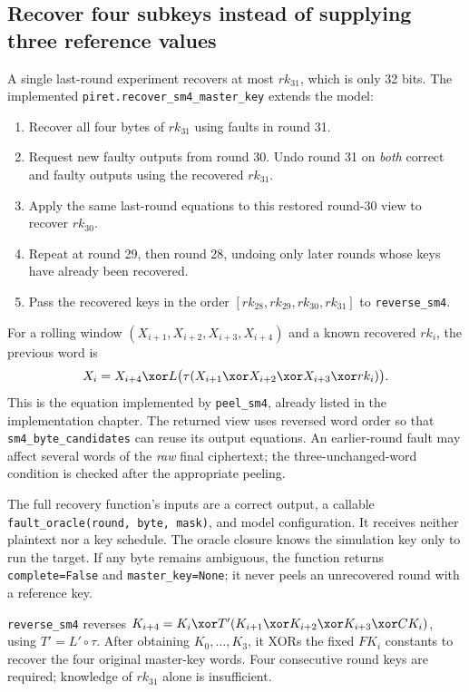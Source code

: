 \subsection{Recover four subkeys instead of supplying three reference values}
A single last-round experiment recovers at most $rk_{31}$, which is only 32 bits. The implemented \texttt{piret.recover\_\allowbreak{}sm4\_\allowbreak{}master\_\allowbreak{}key} extends the model:
\begin{enumerate}
\item Recover all four bytes of $rk_{31}$ using faults in round 31.
\item Request new faulty outputs from round 30. Undo round 31 on \emph{both} correct and faulty outputs using the recovered $rk_{31}$.
\item Apply the same last-round equations to this restored round-30 view to recover $rk_{30}$.
\item Repeat at round 29, then round 28, undoing only later rounds whose keys have already been recovered.
\item Pass the recovered keys in the order $[rk_{28},rk_{29},rk_{30},rk_{31}]$ to \texttt{reverse\_\allowbreak{}sm4}.
\end{enumerate}
For a rolling window $(X_{i+1},X_{i+2},X_{i+3},X_{i+4})$ and a known recovered $rk_i$, the previous word is
\[
X_i=X_{i+4}\xor L\bigl(\tau(X_{i+1}\xor X_{i+2}\xor X_{i+3}\xor rk_i)\bigr).
\]
This is the equation implemented by \texttt{peel\_\allowbreak{}sm4}, already listed in the implementation chapter. The returned view uses reversed word order so that \texttt{sm4\_\allowbreak{}byte\_\allowbreak{}candidates} can reuse its output equations. An earlier-round fault may affect several words of the \emph{raw} final ciphertext; the three-unchanged-word condition is checked after the appropriate peeling.

The full recovery function's inputs are a correct output, a callable \texttt{fault\_\allowbreak{}oracle(round, byte, mask)}, and model configuration. It receives neither plaintext nor a key schedule. The oracle closure knows the simulation key only to run the target. If any byte remains ambiguous, the function returns \texttt{complete=False} and \texttt{master\_\allowbreak{}key=None}; it never peels an unrecovered round with a reference key.

\texttt{reverse\_\allowbreak{}sm4} reverses $K_{i+4}=K_i\xor T'(K_{i+1}\xor K_{i+2}\xor K_{i+3}\xor CK_i)$, using $T'=L'\circ\tau$. After obtaining $K_0,\ldots,K_3$, it XORs the fixed $FK_i$ constants to recover the four original master-key words. Four consecutive round keys are required; knowledge of $rk_{31}$ alone is insufficient.

